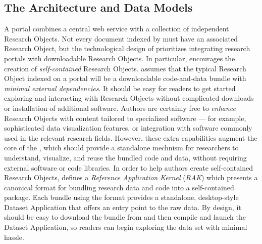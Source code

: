 \documentclass[10pt,letterpaper]{article}
\begin{document}
\subsection{The {\lMOSAIC} Architecture and Data Models}
A {\MOSAIC} portal combines a central web service with a 
collection of independent Research Objects.  Not every 
document indexed by {\MOSAIC} must have an associated 
Research Object, but the technological design of 
{\MOSAIC} prioritizes integrating research portals 
with downloadable Research Objects.
\p{}
In particular, {\MOSAIC} encourages the 
creation of \textit{self-contained} Research Objects.  
{\lfMOSAIC} assumes that the 
typical Research Object indexed on a {\MOSAIC} portal 
will be a downloadable code-and-data bundle 
with \textit{minimal external dependencies}.  
It should be easy for readers to get 
started exploring and interacting with Research Objects 
without complicated downloads or installation of 
additional software.  Authors are certainly free 
to \textit{enhance} Research Objects with 
content tailored to specialized software --- for 
example, sophisticated data visualization features, 
or integration with software commonly used in the 
relevant research fields.  However, these extra capabilities 
augment the core of the {\RO}, which should 
provide a standalone mechnism for researchers to understand, 
visualize, and reuse the bundled code and data, without 
requiring external software or code libraries.
\p{}
In order to help authors create self-contained 
Research Objects, {\MOSAIC} defines a 
\textit{Reference Application Kernel} (\textit{RAK}) 
which presents a canonical format for bundling 
research data and code into a self-contained 
package.   
Each {\RO} bundle using 
the {\RAK} format provides a standalone, desktop-style 
Dataset Application that offers an entry point to 
the raw data.  By design, it should be easy 
to download the {\RAK} bundle from {\MOSAIC} and 
then compile and launch the Dataset Application, so 
readers can begin exploring the data set with 
minimal hassle.  
\end{document}
